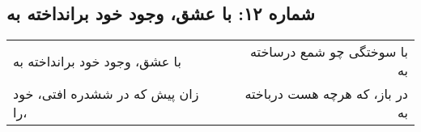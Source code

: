 \begin{center}
\section*{شماره ۱۲: با عشق، وجود خود برانداخته به}
\label{sec:012}
\begin{longtable}{l p{0.5cm} r}
با عشق، وجود خود برانداخته به
&&
با سوختگی چو شمع درساخته به
\\
زان پیش که در ششدره افتی، خود را،
&&
در باز، که هرچه هست درباخته به
\\
\end{longtable}
\end{center}
